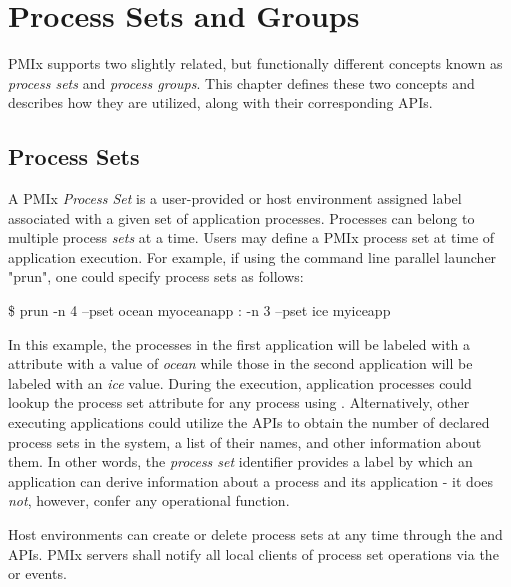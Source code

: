 \chapter{Process Sets and Groups}
\label{chap:api_sets_groups}

\ac{PMIx} supports two slightly related, but functionally different concepts
known as \emph{process sets} and \emph{process groups}. This chapter defines
these two concepts and describes how they are utilized, along with their
corresponding \acp{API}.


\section{Process Sets}
\label{chap:api_sets_groups:sets}

A \ac{PMIx} \emph{Process Set} is a user-provided or host environment assigned
label associated with a given set of application processes. Processes can
belong to multiple process \emph{sets} at a time. Users may define a \ac{PMIx}
process set at time of application execution. For example, if using the command line parallel launcher "prun", one could specify process sets as follows:

\cspecificstart
\begin{codepar}
\$ prun -n 4 --pset ocean myoceanapp : -n 3 --pset ice myiceapp
\end{codepar}
\cspecificend

In this example, the processes in the first application will be labeled with a  attribute with a value of \emph{ocean} while those in the second application will be labeled with an \emph{ice} value. During the execution, application processes could lookup the process set attribute for any process using . Alternatively, other executing applications could utilize the  \acp{API} to obtain the number of declared process sets in the system, a list of their names, and other information about them. In other words, the \emph{process set} identifier provides a label by which an application can derive information about a process and its application - it does \emph{not}, however, confer any operational function.

Host environments can create or delete process sets at any time through the
 and
 \acp{API}. \ac{PMIx} servers shall
notify all local clients of process set operations via the
 or 
events.

